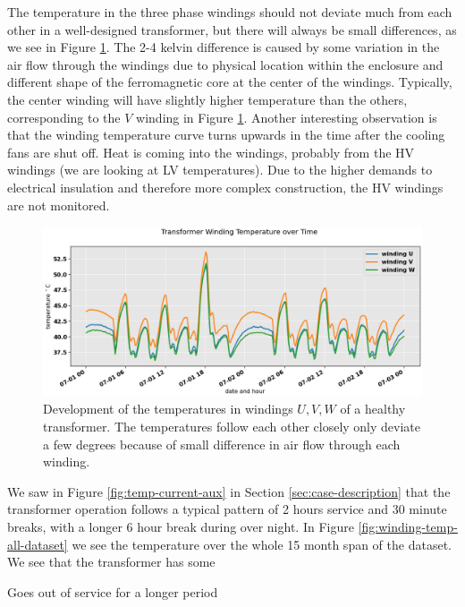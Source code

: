 \documentclass[]{article}
\begin{document}
The temperature in the three phase windings should not deviate much from each other in a well-designed transformer, but there will always be small differences, as we see in Figure \ref{fig:all-winding-temperature-over-time}. The 2-4 kelvin difference is caused by some variation in the air flow through the windings due to physical location within the enclosure and different shape of the ferromagnetic core at the center of the windings. Typically, the center winding will have slightly higher temperature than the others, corresponding to the $V$ winding in Figure \ref{fig:all-winding-temperature-over-time}. Another interesting observation is that the winding temperature curve turns upwards in the time after the cooling fans are shut off. Heat is coming into the windings, probably from the HV windings (we are looking at LV temperatures). Due to the higher demands to electrical insulation and therefore more complex construction, the HV windings are not monitored.

\begin{figure}[!h]
	\centering
	\includegraphics[width=1\linewidth]{./figs/all-winding-temperature-over-time.png}
	\caption{Development of the temperatures in windings $U,V,W$ of a healthy transformer. The temperatures follow each other closely only deviate a few degrees because of small difference in air flow through each winding.}
	\label{fig:all-winding-temperature-over-time}
\end{figure}


We saw in Figure \ref{fig:temp-current-aux} in Section \ref{sec:case-description} that the transformer operation follows a typical pattern of 2 hours service and 30 minute breaks, with a longer 6 hour break during over night. In Figure \ref{fig:winding-temp-all-dataset} we see the temperature over the whole 15 month span of the dataset. We see that the transformer has some 

Goes out of service for a longer period
\end{document}
